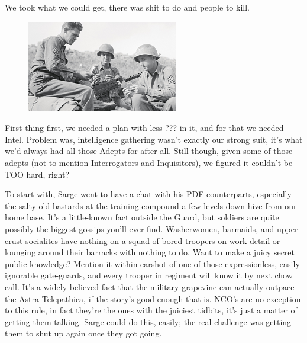 We took what we could get, there was shit to do and people to kill.

\begin{figure}
	\begin{center}
		\includegraphics[width=\figwidth]{pics/19/23.png}
	\end{center}
\end{figure}
First thing first, we needed a plan with less ??? 
in it, and for that we needed Intel. 
Problem was, intelligence gathering wasn't exactly our strong suit, it's what we'd always had all those Adepts for after all. 
Still though, given some of those adepts (not to mention Interrogators and Inquisitors), we figured it couldn't be TOO hard, right?

To start with, Sarge went to have a chat with his PDF counterparts, especially the salty old bastards at the training compound a few levels down-hive from our home base. 
It's a little-known fact outside the Guard, but soldiers are quite possibly the biggest gossips you'll ever find. 
Washerwomen, barmaids, and upper-crust socialites have nothing on a squad of bored troopers on work detail or lounging around their barracks with nothing to do. 
Want to make a juicy secret public knowledge? 
Mention it within earshot of one of those expressionless, easily ignorable gate-guards, and every trooper in regiment will know it by next chow call. 
 It's a widely believed fact that the military grapevine can actually outpace the Astra Telepathica, if the story's good enough that is. 
NCO's are no exception to this rule, in fact they're the ones with the juiciest tidbits, it's just a matter of getting them talking. 
Sarge could do this, easily; 
the real challenge was getting them to shut up again once they got going.

